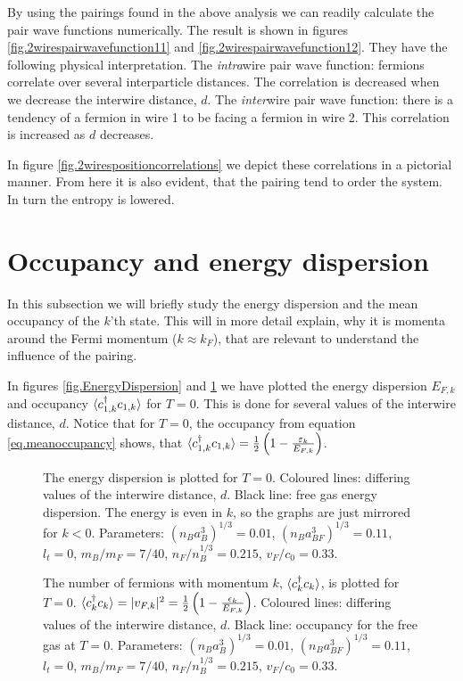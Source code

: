By using the pairings found in the above analysis we can readily calculate the pair wave functions numerically. The result is shown in figures \ref{fig.2wirespairwavefunction11} and \ref{fig.2wirespairwavefunction12}. They have the following physical interpretation. The \textit{intra}wire pair wave function: fermions correlate over several interparticle distances. The correlation is decreased when we decrease the interwire distance, $d$. The \textit{inter}wire pair wave function: there is a tendency of a fermion in wire 1 to be facing a fermion in wire 2. This correlation is increased as $d$ decreases. 

In figure \ref{fig.2wirespositioncorrelations} we depict these correlations in a pictorial manner. From here it is also evident, that the pairing tend to order the system. In turn the entropy is lowered. 

\section{Occupancy and energy dispersion}
\label{sec.Occupancy.energydispersion}
In this subsection we will briefly study the energy dispersion and the mean occupancy of the $k$'th state. This will in more detail explain, why it is momenta around the Fermi momentum ($k \approx k_F$), that are relevant to understand the influence of the pairing.  

In figures \ref{fig.EnergyDispersion} and \ref{fig.Occupancy} we have plotted the energy dispersion $E_{F,k}$ and occupancy $\braket{c_{1,k}^\dagger c_{1,k}}$ for $T = 0$. This is done for several values of the interwire distance, $d$. Notice that for $T = 0$, the occupancy from equation \eqref{eq.meanoccupancy} shows, that $\braket{c_{1,k}^\dagger c_{1,k}} = \frac{1}{2}\left(1 -  \frac{\varepsilon_k}{E_{F,k}}\right)$. 

\begin{figure} 
\begin{center}  
  
\caption{The energy dispersion is plotted for $T = 0$. Coloured lines: differing values of the interwire distance, $d$. Black line: free gas energy dispersion. The energy is even in $k$, so the graphs are just mirrored for $k < 0$. Parameters: $(n_Ba_B^3)^{1/3} = 0.01$, $(n_Ba_{BF}^3)^{1/3} = 0.11$, $l_t = 0$, $m_B / m_F = 7/40$, $n_F / n_B^{1/3} = 0.215$, $v_F / c_0 = 0.33$. }  
\label{fig.EnergyDispersion}  
\vspace{0.5cm} 
  
\caption{The number of fermions with momentum $k$, $\braket{c_k^\dagger c_k}$, is plotted for $T = 0$. $\braket{c_k^\dagger c_k} = |v_{F,k}|^2 = \frac{1}{2}\left(1 - \frac{\epsilon_k}{E_{F,k}}\right)$. Coloured lines: differing values of the interwire distance, $d$. Black line: occupancy for the free gas at $T = 0$. Parameters: $(n_Ba_B^3)^{1/3} = 0.01$, $(n_Ba_{BF}^3)^{1/3} = 0.11$, $l_t = 0$, $m_B / m_F = 7/40$, $n_F / n_B^{1/3} = 0.215$, $v_F / c_0 = 0.33$. }  
\label{fig.Occupancy}  
\end{center}    
\end{figure} 

